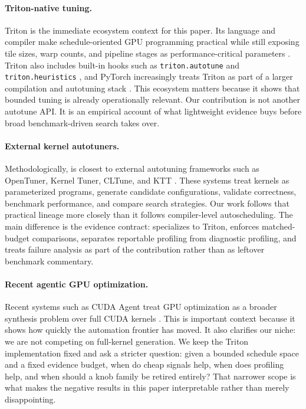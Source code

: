 \paragraph{Triton-native tuning.}
Triton is the immediate ecosystem context for this paper. Its language and compiler make schedule-oriented GPU programming practical while still exposing tile sizes, warp counts, and pipeline stages as performance-critical parameters \citep{tillet2019triton,openai2021triton}. Triton also includes built-in hooks such as \texttt{triton.autotune} and \texttt{triton.heuristics} \citep{tritondocsautotune,tritondocsheuristics}, and PyTorch increasingly treats Triton as part of a larger compilation and autotuning stack \citep{pytorchcompile2026,pytorchtriton2026}. This ecosystem matters because it shows that bounded tuning is already operationally relevant. Our contribution is not another autotune API. It is an empirical account of what lightweight evidence buys before broad benchmark-driven search takes over.

\paragraph{External kernel autotuners.}
Methodologically, \system is closest to external autotuning frameworks such as OpenTuner, Kernel Tuner, CLTune, and KTT \citep{ansel2014opentuner,vanwerkhoven2019kerneltuner,nugteren2015cltune,petrov2023ktt}. These systems treat kernels as parameterized programs, generate candidate configurations, validate correctness, benchmark performance, and compare search strategies. Our work follows that practical lineage more closely than it follows compiler-level autoscheduling. The main difference is the evidence contract: \system specializes to Triton, enforces matched-budget comparisons, separates reportable profiling from diagnostic profiling, and treats failure analysis as part of the contribution rather than as leftover benchmark commentary.

\paragraph{Recent agentic GPU optimization.}
Recent systems such as CUDA Agent treat GPU optimization as a broader synthesis problem over full CUDA kernels \citep{dai2026cudaagent}. This is important context because it shows how quickly the automation frontier has moved. It also clarifies our niche: we are not competing on full-kernel generation. We keep the Triton implementation fixed and ask a stricter question: given a bounded schedule space and a fixed evidence budget, when do cheap signals help, when does profiling help, and when should a knob family be retired entirely? That narrower scope is what makes the negative results in this paper interpretable rather than merely disappointing.

